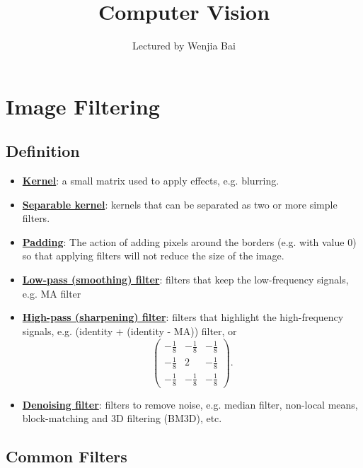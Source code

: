 \documentclass[twocolumn,landscape,10pt]{article}
\author{Lectured by Wenjia Bai}
\title{Computer Vision}
\affil{Typed by Aris Zhu Yi Qing}
\theoremstyle{definition}
\begin{document}
\maketitle
\tableofcontents

\newpage
\section{Image Filtering}

\subsection{Definition}

\begin{itemize}
    \item \underline{\textbf{Kernel}}: a small matrix used to apply effects,
        e.g. blurring.
    \item \underline{\textbf{Separable kernel}}: kernels that can be separated
        as two or more simple filters.
    \item \underline{\textbf{Padding}}: The action of adding pixels around the
        borders (e.g. with value 0) so that applying filters 
        will not reduce the size of the image.
    \item \underline{\textbf{Low-pass (smoothing) filter}}: filters that keep the
        low-frequency signals, e.g. MA filter
    \item \underline{\textbf{High-pass (sharpening) filter}}: filters that highlight the
        high-frequency signals, e.g. (identity + (identity - MA)) filter, or
        \[
            \begin{pmatrix}
                -\frac{1}{8} & -\frac{1}{8} & -\frac{1}{8} \\[4px]
                -\frac{1}{8} & 2 & -\frac{1}{8} \\[4px]
                -\frac{1}{8} & -\frac{1}{8} & -\frac{1}{8}
            \end{pmatrix}.
        \]
    \item \underline{\textbf{Denoising filter}}: filters to remove noise, e.g.
        median filter, non-local means, block-matching and 3D filtering (BM3D),
        etc.
\end{itemize} 


\subsection{Common Filters}
\end{document}
